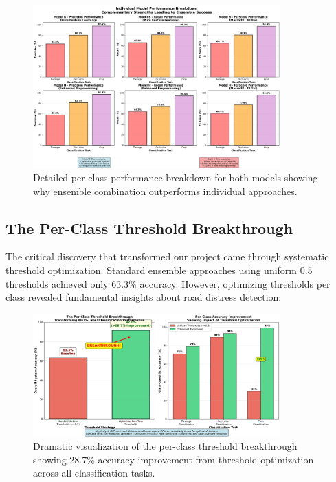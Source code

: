 \documentclass[12pt]{article}
\begin{document}
\begin{figure}[!htb]
\centering
\includegraphics[width=0.85\textwidth]{images/individual_model_breakdown.png}
\caption{Detailed per-class performance breakdown for both models showing why ensemble combination outperforms individual approaches.}
\end{figure}

\subsection{The Per-Class Threshold Breakthrough}

The critical discovery that transformed our project came through systematic threshold optimization. Standard ensemble approaches using uniform 0.5 thresholds achieved only 63.3\% accuracy. However, optimizing thresholds per class revealed fundamental insights about road distress detection:

\begin{figure}[!htb]
\centering
\includegraphics[width=0.85\textwidth]{images/breakthrough_analysis.png}
\caption{Dramatic visualization of the per-class threshold breakthrough showing 28.7\% accuracy improvement from threshold optimization across all classification tasks.}
\end{figure}
\end{document}
